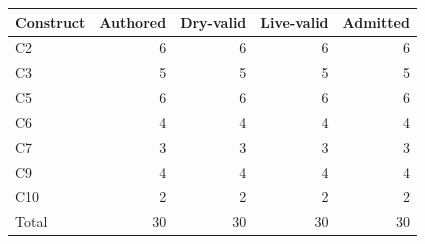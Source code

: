 \begin{tabular}{lrrrr}
\hline
Construct & Authored & Dry-valid & Live-valid & Admitted \\
\hline
C2 & 6 & 6 & 6 & 6 \\
C3 & 5 & 5 & 5 & 5 \\
C5 & 6 & 6 & 6 & 6 \\
C6 & 4 & 4 & 4 & 4 \\
C7 & 3 & 3 & 3 & 3 \\
C9 & 4 & 4 & 4 & 4 \\
C10 & 2 & 2 & 2 & 2 \\
\hline
Total & 30 & 30 & 30 & 30 \\
\hline
\end{tabular}
